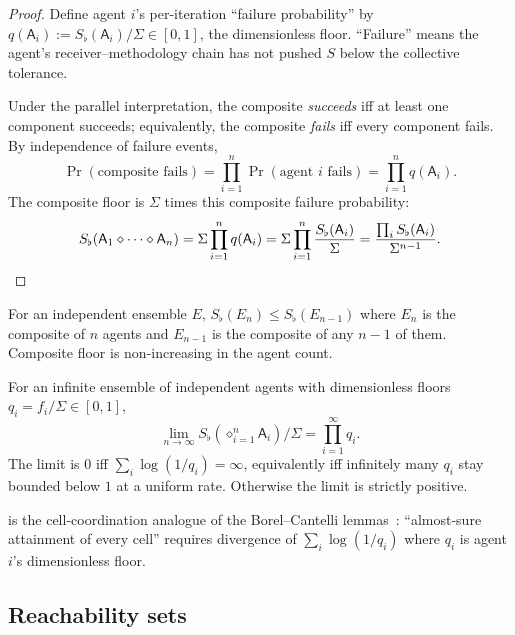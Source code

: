 \documentclass[11pt,a4paper]{article}
\newcommand{\agent}{\mathsf{A}}
\newcommand{\Sfloor}{S_{\flat}}
\newcommand{\Compose}{\diamond}
\begin{document}
\begin{proof}
Define agent $i$'s per-iteration ``failure probability'' by
$q(\agent_i):=\Sfloor(\agent_i)/\Sigma\in[0,1]$, the dimensionless
floor. ``Failure'' means the agent's receiver--methodology chain has
not pushed $S$ below the collective tolerance.

Under the parallel interpretation, the composite \emph{succeeds} iff
at least one component succeeds; equivalently, the composite
\emph{fails} iff every component fails. By independence of failure
events,
\[
\Pr(\text{composite fails})=\prod_{i=1}^n\Pr(\text{agent }i\text{ fails})
=\prod_{i=1}^n q(\agent_i).
\]
The composite floor is $\Sigma$ times this composite failure
probability:
\[
\Sfloor(\agent_1\Compose\cdots\Compose\agent_n)
=\Sigma\prod_{i=1}^n q(\agent_i)
=\Sigma\prod_{i=1}^n\frac{\Sfloor(\agent_i)}{\Sigma}
=\frac{\prod_i\Sfloor(\agent_i)}{\Sigma^{n-1}}. \qedhere
\]
\end{proof}

\begin{corollary}\label{cor:monotone}
For an independent ensemble $E$, $\Sfloor(E_n)\le\Sfloor(E_{n-1})$
where $E_n$ is the composite of $n$ agents and $E_{n-1}$ is the
composite of any $n-1$ of them. Composite floor is non-increasing in
the agent count.
\end{corollary}

\begin{corollary}\label{cor:asymptotic}
For an infinite ensemble of independent agents with dimensionless
floors $q_i=f_i/\Sigma\in[0,1]$,
\[
\lim_{n\to\infty}\Sfloor(\Compose_{i=1}^n\agent_i)/\Sigma
=\prod_{i=1}^\infty q_i.
\]
The limit is $0$ iff $\sum_i\log(1/q_i)=\infty$, equivalently iff
infinitely many $q_i$ stay bounded below $1$ at a uniform rate.
Otherwise the limit is strictly positive.
\end{corollary}

\begin{remark}\label{rem:bc-analogue}
 is the cell-coordination analogue of the
Borel--Cantelli lemmas~\cite{borel1909,cantelli1917}: ``almost-sure
attainment of every cell'' requires divergence of
$\sum_i\log(1/q_i)$ where $q_i$ is agent $i$'s dimensionless floor.
\end{remark}

\subsection{Reachability sets}
\end{document}
